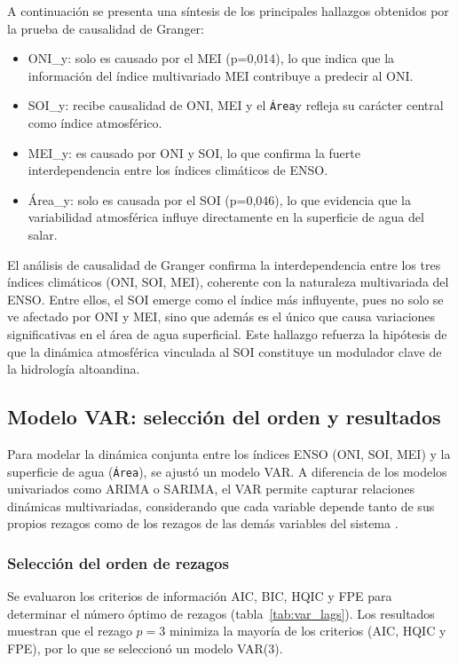 A continuación se presenta una síntesis de los principales hallazgos obtenidos por la prueba de causalidad de Granger:
\begin{itemize}
    \item ONI\_y: solo es causado por el MEI (p=0,014), lo que indica que la información del índice multivariado MEI contribuye a predecir al ONI.
    \item SOI\_y: recibe causalidad de ONI, MEI y el \texttt{Área}y refleja su carácter central como índice atmosférico.
    \item MEI\_y: es causado por ONI y SOI, lo que confirma la fuerte interdependencia entre los índices climáticos de ENSO.
    \item Área\_y: solo es causada por el SOI (p=0,046), lo que evidencia que la variabilidad atmosférica influye directamente en la superficie de agua del salar.
\end{itemize}


El análisis de causalidad de Granger confirma la interdependencia entre los tres índices climáticos (ONI, SOI, MEI), coherente con la naturaleza multivariada del ENSO. Entre ellos, el SOI emerge como el índice más influyente, pues no solo se ve afectado por ONI y MEI, sino que además es el único que causa variaciones significativas en el área de agua superficial. Este hallazgo refuerza la hipótesis de que la dinámica atmosférica vinculada al SOI constituye un modulador clave de la hidrología altoandina.

\subsection{Modelo VAR: selección del orden y resultados}

Para modelar la dinámica conjunta entre los índices ENSO (ONI, SOI, MEI) y la superficie de agua (\texttt{Área}), se ajustó un modelo VAR. A diferencia de los modelos univariados como ARIMA o SARIMA, el VAR permite capturar relaciones dinámicas multivariadas, considerando que cada variable depende tanto de sus propios rezagos como de los rezagos de las demás variables del sistema \cite{lutkepohl2005new}.

\subsubsection{Selección del orden de rezagos}
Se evaluaron los criterios de información AIC, BIC, HQIC y FPE para determinar el número óptimo de rezagos (tabla~\ref{tab:var_lags}). Los resultados muestran que el rezago $p=3$ minimiza la mayoría de los criterios (AIC, HQIC y FPE), por lo que se seleccionó un modelo VAR(3).

